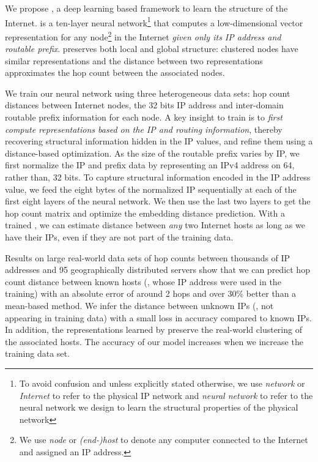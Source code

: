 We propose \system{}, a deep learning based framework to learn the structure of the Internet. 
\system{} is a ten-layer neural network\footnote{To avoid confusion and unless explicitly stated otherwise, we use {\em network} or {\em Internet} to refer to the physical IP network and {\em neural network} to refer to the neural network we design to learn the structural properties of the physical network} that computes a low-dimensional vector representation for any node\footnote{We use {\em node} or {\em (end-)host} to denote any computer connected to the Internet and assigned an IP address.} in the Internet {\em given only its IP address and routable prefix}. \system{} preserves both local and global structure: clustered  nodes have similar representations and the distance between two representations approximates the hop count between the associated nodes.

We train our neural network using three heterogeneous data sets: hop count distances between Internet nodes, the 32 bits IP address and inter-domain routable prefix information for each node. 
%
A key insight to train \system{} is to {\em first compute representations based on the IP and routing information}, thereby recovering structural information hidden in the IP values, and refine them using a distance-based optimization.
%
As the size of the routable prefix varies by IP, we first normalize the IP and prefix data by representing an IPv4 address on 64, rather than, 32 bits. To capture structural information encoded in the IP address value, we feed the eight bytes of the normalized IP sequentially at each of the first eight layers of the neural network. We then use the last two layers to get the hop count matrix and optimize the embedding distance prediction. With a trained \system{}, we can estimate distance between {\em any} two Internet hosts as long as we have their IPs, even if they are not part of the training data. 

Results on large real-world data sets of hop counts between thousands of IP addresses and 95 geographically distributed servers show that we can predict hop count distance between known hosts (\ie{}, whose IP address were used in the training) with an absolute error of around 2 hops and over 30\% better than a mean-based method. We infer the distance between unknown IPs (\ie{}, not appearing in training data) with a small loss in accuracy compared to known IPs. In addition, the representations learned by \system{} preserve the real-world clustering of the associated hosts. The accuracy of our model increases when we increase the training data set.





